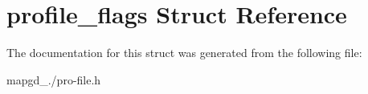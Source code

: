 \hypertarget{structprofile__flags}{\section{profile\-\_\-flags Struct Reference}
\label{structprofile__flags}
}


The documentation for this struct was generated from the following file\-:\begin{DoxyCompactItemize}
\item 
mapgd\-\_./pro-\/file.\-h\end{DoxyCompactItemize}
